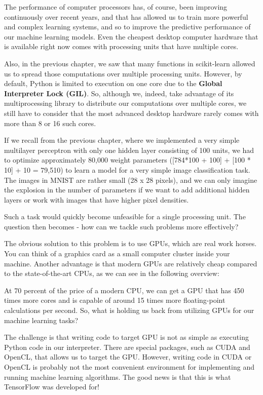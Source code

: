 \documentclass[11pt]{article}
\begin{document}
The performance of computer processors has, of course, been improving
continuously over recent years, and that has allowed us to train more
powerful and complex learning systems, and so to improve the predictive
performance of our machine learning models. Even the cheapest desktop
computer hardware that is available right now comes with processing
units that have multiple cores.

Also, in the previous chapter, we saw that many functions in
scikit-learn allowed us to spread those computations over multiple
processing units. However, by default, Python is limited to execution on
one core due to the \textbf{Global Interpreter Lock (GIL)}. So, although
we, indeed, take advantage of its multiprocessing library to distribute
our computations over multiple cores, we still have to consider that the
most advanced desktop hardware rarely comes with more than 8 or 16 such
cores.

If we recall from the previous chapter, where we implemented a very
simple multilayer perceptron with only one hidden layer consisting of
100 units, we had to optimize approximately 80,000 weight parameters
({[}784*100 + 100{]} + {[}100 * 10{]} + 10 = 79,510) to learn a model
for a very simple image classification task. The images in MNIST are
rather small (28 x 28 pixels), and we can only imagine the explosion in
the number of parameters if we want to add additional hidden layers or
work with images that have higher pixel densities.

Such a task would quickly become unfeasible for a single processing
unit. The question then becomes - how can we tackle such problems more
effectively?

The obvious solution to this problem is to use GPUs, which are real work
horses. You can think of a graphics card as a small computer cluster
inside your machine. Another advantage is that modern GPUs are
relatively cheap compared to the state-of-the-art CPUs, as we can see in
the following overview:

At 70 percent of the price of a modern CPU, we can get a GPU that has
450 times more cores and is capable of around 15 times more
floating-point calculations per second. So, what is holding us back from
utilizing GPUs for our machine learning tasks?

The challenge is that writing code to target GPU is not as simple as
executing Python code in our interpreter. There are special packages,
such as CUDA and OpenCL, that allows us to target the GPU. However,
writing code in CUDA or OpenCL is probably not the most convenient
environment for implementing and running machine learning algorithms.
The good news is that this is what TensorFlow was developed for!
\end{document}
